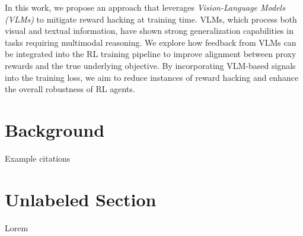 \documentclass{article}
\begin{document}
In this work, we propose an approach that leverages \textit{Vision-Language Models (VLMs)} to mitigate reward hacking at training time. VLMs, which process both visual and textual information, have shown strong generalization capabilities in tasks requiring multimodal reasoning. We explore how feedback from VLMs can be integrated into the RL training pipeline to improve alignment between proxy rewards and the true underlying objective. By incorporating VLM-based signals into the training loss, we aim to reduce instances of reward hacking and enhance the overall robustness of RL agents.

\section{Background}
Example citations \cite{amodei2016concrete} \cite{pan2022effectsrewardmisspecificationmapping} \cite{skalse2022definingcharacterizingrewardhacking}


\section*{Unlabeled Section}
Lorem


 
\end{document}
